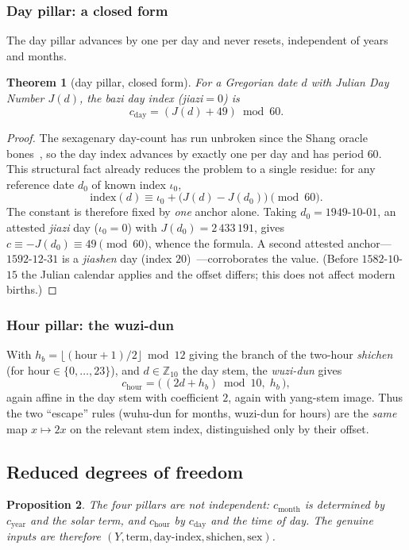\documentclass[11pt,a4paper]{article}
\newtheorem{theorem}{Theorem}[section]
\newtheorem{proposition}[theorem]{Proposition}
\theoremstyle{definition}
\theoremstyle{remark}
\newcommand{\Z}{\mathbb{Z}}
\begin{document}
\subsubsection{Day pillar: a closed form}
The day pillar advances by one per day and never resets, independent of years and months.

\begin{theorem}[day pillar, closed form]\label{thm:daypillar}
For a Gregorian date $d$ with Julian Day Number $J(d)$, the bazi day index (\emph{jiazi}$=0$) is
\[
c_{\text{day}}=(J(d)+49)\bmod 60.
\]
\end{theorem}
\begin{proof}
The sexagenary day-count has run unbroken since the Shang oracle bones~\cite{needham1959}, so the day index advances by exactly one per day and has period $60$. This structural fact already reduces the problem to a single residue: for any reference date $d_0$ of known index $\iota_0$,
\[
\mathrm{index}(d)\equiv \iota_0+\big(J(d)-J(d_0)\big)\pmod{60}.
\]
The constant is therefore fixed by \emph{one} anchor alone. Taking $d_0=1949\text{-}10\text{-}01$, an attested \emph{jiazi} day ($\iota_0=0$) with $J(d_0)=2\,433\,191$, gives $c\equiv -J(d_0)\equiv 49\pmod{60}$, whence the formula. A second attested anchor---$1592$-$12$-$31$ is a \emph{jiashen} day (index $20$)~\cite{chenshu}---corroborates the value. (Before $1582$-$10$-$15$ the Julian calendar applies and the offset differs; this does not affect modern births.)
\end{proof}

\subsubsection{Hour pillar: the wuzi-dun}
With $h_b=\big\lfloor(\text{hour}+1)/2\big\rfloor\bmod 12$ giving the branch of the two-hour \emph{shichen} (for $\text{hour}\in\{0,\dots,23\}$), and $d\in\Z_{10}$ the day stem, the \emph{wuzi-dun} gives
\[
c_{\text{hour}}=\big(\,(2d+h_b)\bmod 10,\;h_b\,\big),
\]
again affine in the day stem with coefficient $2$, again with yang-stem image. Thus the two ``escape'' rules (wuhu-dun for months, wuzi-dun for hours) are the \emph{same} map $x\mapsto 2x$ on the relevant stem index, distinguished only by their offset.

\subsection{Reduced degrees of freedom}
\begin{proposition}\label{prop:dof}
The four pillars are not independent: $c_{\text{month}}$ is determined by $c_{\text{year}}$ and the solar term, and $c_{\text{hour}}$ by $c_{\text{day}}$ and the time of day. The genuine inputs are therefore $(Y,\text{term},\text{day-index},\text{shichen},\text{sex})$.
\end{proposition}
\end{document}
